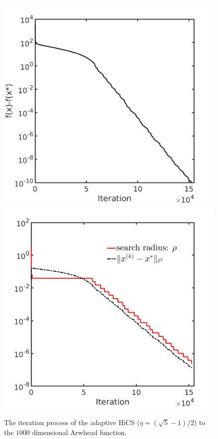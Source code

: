 \documentclass[mathpazo]{csam}
\theoremstyle{remark}
\begin{document}
\begin{figure}[!htbp]
	\centering
	  \includegraphics[scale=0.25]{../figures/arwhead1000D.png}
	  \includegraphics[scale=0.25]{../figures/arwhead1000D_dist.png}
  \caption{The iteration process of the adaptive HiCS 
  ($\eta=(\sqrt{5}-1)/2$) to the $1000$ dimensional Arwhead function.}
	\label{fig:arwhead}
\end{figure}
\end{document}
